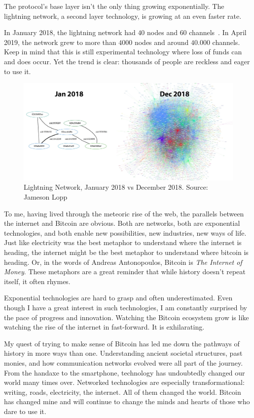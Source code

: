 The protocol's base layer isn't the only thing growing exponentially.
The lightning network, a second layer technology, is growing at an even
faster rate.

In January 2018, the lightning network had $40$ nodes and $60$
channels~\cite{web:lightning-nodes}. In April 2019, the network grew to more
than $4000$ nodes and around $40.000$ channels. Keep in mind that this is still
experimental technology where loss of funds can and does occur. Yet the trend is
clear: thousands of people are reckless and eager to use it.

\begin{figure}
  \includegraphics[width=\textwidth]{assets/images/lnd-growth-lopp-white.png}
  \caption{Lightning Network, January 2018 vs December 2018. Source: Jameson Lopp}
  \label{fig:lnd-growth-lopp-white.png}
\end{figure}

To me, having lived through the meteoric rise of the web, the parallels
between the internet and Bitcoin are obvious. Both are networks, both
are exponential technologies, and both enable new possibilities, new
industries, new ways of life. Just like electricity was the best
metaphor to understand where the internet is heading, the internet might
be the best metaphor to understand where bitcoin is heading. Or, in the
words of Andreas Antonopoulos, Bitcoin is \textit{The Internet of Money}.
These metaphors are a great reminder that while history doesn't repeat
itself, it often rhymes.

Exponential technologies are hard to grasp and often underestimated.
Even though I have a great interest in such technologies, I am
constantly surprised by the pace of progress and innovation. Watching
the Bitcoin ecosystem grow is like watching the rise of the internet in
fast-forward. It is exhilarating.

My quest of trying to make sense of Bitcoin has led me down the pathways
of history in more ways than one. Understanding ancient societal
structures, past monies, and how communication networks evolved were all
part of the journey. From the handaxe to the smartphone, technology has
undoubtedly changed our world many times over. Networked technologies
are especially transformational: writing, roads, electricity, the
internet. All of them changed the world. Bitcoin has changed mine and
will continue to change the minds and hearts of those who dare to use
it.

